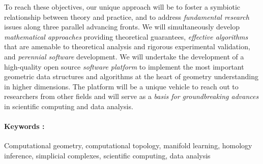 To reach these objectives, our unique approach  will be to foster a
symbiotic relationship between theory and practice, and to address
{\em fundamental research} issues along three parallel advancing
fronts. We will simultaneously develop {\em mathematical approaches}
providing theoretical guarantees, {\em effective algorithms} that are
amenable to theoretical analysis and rigorous experimental validation,
and {\em perennial software} development.  We will undertake the
development of a high-quality open source {\em software platform} to
implement the most important geometric data structures and algorithms
at the heart of geometry understanding in higher dimensions. The
platform will be a unique vehicle to reach out to researchers from other
fields and will serve as a {\em basis for groundbreaking advances} in
scientific computing and data analysis.

\paragraph{Keywords :} Computational geometry, computational topology,
manifold learning, homology inference, simplicial complexes,
scientific computing, data analysis
